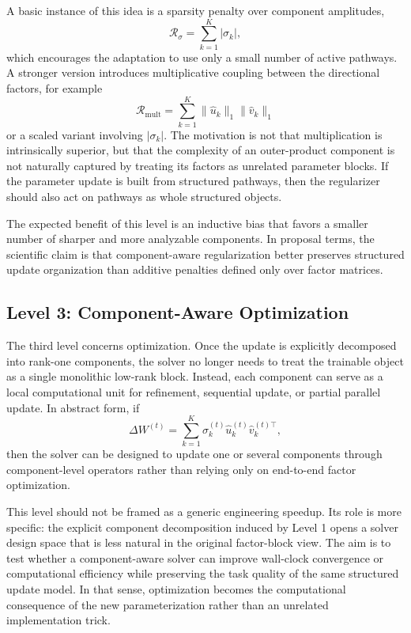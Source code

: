 \documentclass[11pt]{article}
\begin{document}
A basic instance of this idea is a sparsity penalty over component amplitudes,
\[
\mathcal{R}_{\sigma} = \sum_{k=1}^{K} |\sigma_k|,
\]
which encourages the adaptation to use only a small number of active pathways. A stronger version introduces multiplicative coupling between the directional factors, for example
\[
\mathcal{R}_{\mathrm{mult}} = \sum_{k=1}^{K} \|\hat{u}_k\|_1 \|\hat{v}_k\|_1
\]
or a scaled variant involving $|\sigma_k|$. The motivation is not that multiplication is intrinsically superior, but that the complexity of an outer-product component is not naturally captured by treating its factors as unrelated parameter blocks. If the parameter update is built from structured pathways, then the regularizer should also act on pathways as whole structured objects.

The expected benefit of this level is an inductive bias that favors a smaller number of sharper and more analyzable components. In proposal terms, the scientific claim is that component-aware regularization better preserves structured update organization than additive penalties defined only over factor matrices.

\subsection{Level 3: Component-Aware Optimization}

The third level concerns optimization. Once the update is explicitly decomposed into rank-one components, the solver no longer needs to treat the trainable object as a single monolithic low-rank block. Instead, each component can serve as a local computational unit for refinement, sequential update, or partial parallel update. In abstract form, if
\[
\Delta W^{(t)} = \sum_{k=1}^{K} \sigma_k^{(t)} \hat{u}_k^{(t)} \hat{v}_k^{(t)\top},
\]
then the solver can be designed to update one or several components through component-level operators rather than relying only on end-to-end factor optimization.

This level should not be framed as a generic engineering speedup. Its role is more specific: the explicit component decomposition induced by Level 1 opens a solver design space that is less natural in the original factor-block view. The aim is to test whether a component-aware solver can improve wall-clock convergence or computational efficiency while preserving the task quality of the same structured update model. In that sense, optimization becomes the computational consequence of the new parameterization rather than an unrelated implementation trick.
\end{document}
